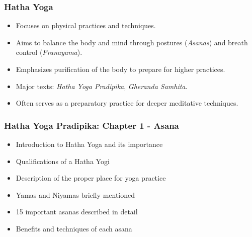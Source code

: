\begin{frame}[fragile]\frametitle{Hatha Yoga}

      \begin{itemize}
		\item Focuses on physical practices and techniques.
		\item Aims to balance the body and mind through postures (\textit{Asanas}) and breath control (\textit{Pranayama}).
		\item Emphasizes purification of the body to prepare for higher practices.
		\item Major texts: \textit{Hatha Yoga Pradipika}, \textit{Gheranda Samhita}.
		\item Often serves as a preparatory practice for deeper meditative techniques.
	  \end{itemize}

\end{frame}


\begin{frame}[fragile]\frametitle{Hatha Yoga Pradipika: Chapter 1 - Asana}
\begin{itemize}
    \item Introduction to Hatha Yoga and its importance
    \item Qualifications of a Hatha Yogi
    \item Description of the proper place for yoga practice
    \item Yamas and Niyamas briefly mentioned
    \item 15 important asanas described in detail
    \item Benefits and techniques of each asana
\end{itemize}
\end{frame}

